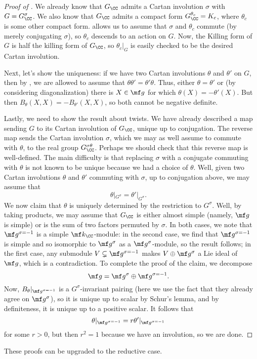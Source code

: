 \documentclass[../notes.tex]{subfiles}
\begin{document}
\begin{proof}[Proof of ]
	We already know that $G_\CC$ admits a Cartan involution $\sigma$ with $G=G_\CC^\sigma$. We also know that $G_\CC$ admits a compact form $G_\CC^{\theta_c}=K_c$, where $\theta_c$ is some other compact form.  allows us to assume that $\sigma$ and $\theta_c$ commute (by merely conjugating $\sigma$), so $\theta_c$ descends to an action on $G$. Now, the Killing form of $G$ is half the killing form of $G_\CC$, so $\theta_c|_G$ is easily checked to be the desired Cartan involution.

	Next, let's show the uniqueness: if we have two Cartan involutions $\theta$ and $\theta'$ on $G$, then by , we are allowed to assume that $\theta\theta'=\theta'\theta$. Thus, either $\theta=\theta'$ or (by considering diagonalization) there is $X\in\mf g$ for which $\theta(X)=-\theta'(X)$. But then $B_\theta(X,X)=-B_{\theta'}(X,X)$, so both cannot be negative definite.

	Lastly, we need to show the result about twists. We have already described a map sending $G$ to its Cartan involution of $G_\CC$, unique up to conjugation. The reverse map sends the Cartan involution $\sigma$, which we may as well assume to commute with $\theta$, to the real group $G_\CC^{\sigma\theta}$. Perhaps we should check that this reverse map is well-defined. The main difficulty is that replacing $\sigma$ with a conjugate commuting with $\theta$ is not known to be unique because we had a choice of $\theta$. Well, given two Cartan involutions $\theta$ and $\theta'$ commuting with $\sigma$, up to conjugation above, we may assume that
	\[\theta|_{G^\sigma}=\theta'|_{G^\sigma}.\]
	We now claim that $\theta$ is uniquely determined by the restriction to $G^\sigma$. Well, by taking products, we may assume that $G_\CC$ is either almost simple (namely, $\mf g$ is simple) or is the sum of two factors permuted by $\sigma$. In both cases, we note that $\mf g^{\sigma=-1}$ is a simple $\mf k_\CC$-module: in the second case, we find that $\mf g^{\sigma=-1}$ is simple and so isomorphic to $\mf g^{\sigma}$ as a $\mf g^\sigma$-module, so the result follows; in the first case, any submodule $V\subsetneq\mf g^{\sigma=-1}$ makes $V\oplus\mf g^\sigma$ a Lie ideal of $\mf g$, which is a contradiction. To complete the proof of the claim, we decompose
	\[\mf g=\mf g^\sigma\oplus\mf g^{\sigma=-1}.\]
	Now, $B_\theta|_{\mf g^{\sigma=-1}}$ is a $G^\sigma$-invariant pairing (here we use the fact that they already agree on $\mf g^\sigma$), so it is unique up to scalar by Schur's lemma, and by definiteness, it is unique up to a positive scalar. It follows that
	\[\theta|_{\mf g^{\sigma=-1}}=r\theta'|_{\mf g^{\sigma=-1}}\]
	for some $r>0$, but then $r^2=1$ because we have an involution, so we are done.
\end{proof}
\begin{remark}
	These proofs can be upgraded to the reductive case.
\end{remark}
\end{document}

